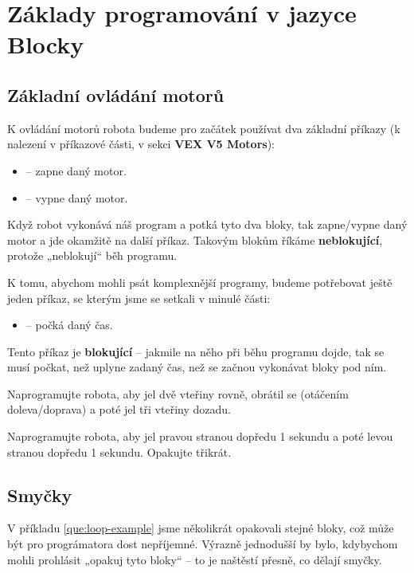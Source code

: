 \documentclass[../main.tex]{subfiles}
\begin{document}
	\section{Základy programování v jazyce Blocky}


	\subsection{Základní ovládání motorů}
	K ovládání motorů robota budeme pro začátek používat dva základní příkazy (k nalezení v příkazové části, v sekci \textbf{VEX V5 Motors}):
	\begin{itemize}
		\item[\block]  -- zapne daný motor.
		\item[\block]  -- vypne daný motor.
	\end{itemize}

	Když robot vykonává náš program a potká tyto dva bloky, tak zapne/vypne daný motor a jde okamžitě na další příkaz. Takovým blokům říkáme \textbf{neblokující}, protože „neblokují“ běh programu.

	K tomu, abychom mohli psát komplexnější programy, budeme potřebovat ještě jeden příkaz, se kterým jsme se setkali v minulé části:
	\begin{itemize}
		\item[\block]  -- počká daný čas.
	\end{itemize}

	Tento příkaz je \textbf{blokující} -- jakmile na něho při běhu programu dojde, tak se musí počkat, než uplyne zadaný čas, než se začnou vykonávat bloky pod ním.

	\begin{question}
		Naprogramujte robota, aby jel dvě vteřiny rovně, obrátil se (otáčením doleva/doprava) a poté jel tři vteřiny dozadu.
	\end{question}

	\begin{question}\label{que:loop-example}%
		Naprogramujte robota, aby jel pravou stranou dopředu 1 sekundu a poté levou stranou dopředu 1 sekundu. Opakujte třikrát.
	\end{question}

	\subsection{Smyčky}
	V příkladu \ref{que:loop-example} jsme několikrát opakovali stejné bloky, což může být pro prográmatora dost nepříjemné. Výrazně jednodušší by bylo, kdybychom mohli prohlásit „opakuj tyto bloky“ -- to je naštěstí přesně, co dělají smyčky.
\end{document}

